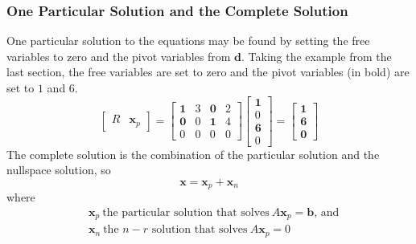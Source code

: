         \subsubsection{One Particular Solution and the Complete Solution}
            One particular solution to the equations may be found by setting the free variables to zero and the pivot 
            variables from \(\boldsymbol{d}\). Taking the example from the last section, the free variables are set to 
            zero and the pivot variables (in bold) are set to \(1\) and \(6\).
            \begin{equation}
                \begin{bmatrix}
                    R & \boldsymbol{x}_p
                \end{bmatrix}
                =
                \begin{bmatrix}
                    \boldsymbol{1} & 3 & \boldsymbol{0} & 2 \\
                    \boldsymbol{0} & 0 & \boldsymbol{1} & 4 \\
                    0 & 0 & 0 & 0
                \end{bmatrix}
                \begin{bmatrix}
                    \boldsymbol{1} \\ 0 \\ \boldsymbol{6} \\ 0
                \end{bmatrix}
                =
                \begin{bmatrix}
                    \boldsymbol{1} \\ \boldsymbol{6} \\ \boldsymbol{0}
                \end{bmatrix}
            \end{equation}
            The complete solution is the combination of the particular solution and the nullspace solution, so
            \begin{equation}
                \boldsymbol{x} = \boldsymbol{x}_p + \boldsymbol{x}_n
            \end{equation}
            where
            \begin{equation}
                \begin{split}
                    &\boldsymbol{x}_p \ \textrm{the particular solution that solves} \ A\boldsymbol{x}_p = \boldsymbol{b}
                    \textrm{, and} \\
                    &\boldsymbol{x}_n \ \textrm{the \(n-r\) solution that solves} \ A\boldsymbol{x}_p = 0                   
                \end{split}
            \end{equation}

